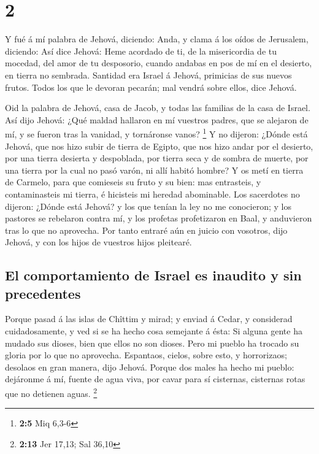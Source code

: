 \hypertarget{section-1}{%
\section{2}\label{section-1}}

 Y fué á mí palabra de Jehová, diciendo: 
Anda, y clama á los oídos de Jerusalem, diciendo: Así dice Jehová: Heme
acordado de ti, de la misericordia de tu mocedad, del amor de tu
desposorio, cuando andabas en pos de mí en el desierto, en tierra no
sembrada.  Santidad era Israel á Jehová, primicias de sus
nuevos frutos. Todos los que le devoran pecarán; mal vendrá sobre ellos,
dice Jehová.

 Oid la palabra de Jehová, casa de Jacob, y todas las
familias de la casa de Israel.  Así dijo Jehová: ¿Qué
maldad hallaron en mí vuestros padres, que se alejaron de mí, y se
fueron tras la vanidad, y tornáronse vanos? \footnote{\textbf{2:5} Miq
  6,3-6}  Y no dijeron: ¿Dónde está Jehová, que nos hizo
subir de tierra de Egipto, que nos hizo andar por el desierto, por una
tierra desierta y despoblada, por tierra seca y de sombra de muerte, por
una tierra por la cual no pasó varón, ni allí habitó hombre?
 Y os metí en tierra de Carmelo, para que comieseis su
fruto y su bien: mas entrasteis, y contaminasteis mi tierra, é hicisteis
mi heredad abominable.  Los sacerdotes no dijeron: ¿Dónde
está Jehová? y los que tenían la ley no me conocieron; y los pastores se
rebelaron contra mí, y los profetas profetizaron en Baal, y anduvieron
tras lo que no aprovecha.  Por tanto entraré aún en juicio
con vosotros, dijo Jehová, y con los hijos de vuestros hijos pleitearé.

\hypertarget{el-comportamiento-de-israel-es-inaudito-y-sin-precedentes}{%
\subsection{El comportamiento de Israel es inaudito y sin
precedentes}\label{el-comportamiento-de-israel-es-inaudito-y-sin-precedentes}}

 Porque pasad á las islas de Chîttim y mirad; y enviad á
Cedar, y considerad cuidadosamente, y ved si se ha hecho cosa semejante
á ésta:  Si alguna gente ha mudado sus dioses, bien que
ellos no son dioses. Pero mi pueblo ha trocado su gloria por lo que no
aprovecha.  Espantaos, cielos, sobre esto, y horrorizaos;
desolaos en gran manera, dijo Jehová.  Porque dos males
ha hecho mi pueblo: dejáronme á mí, fuente de agua viva, por cavar para
sí cisternas, cisternas rotas que no detienen aguas. \footnote{\textbf{2:13}
  Jer 17,13; Sal 36,10}

